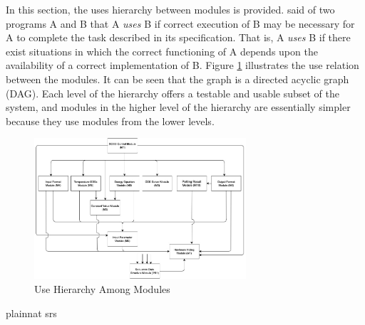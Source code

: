 \documentclass[12pt, titlepage]{article}
\begin{document}
In this section, the uses hierarchy between modules is
provided. \citet{Parnas1978} said of two programs A and B that A {\em uses} B if
correct execution of B may be necessary for A to complete the task described in
its specification. That is, A {\em uses} B if there exist situations in which
the correct functioning of A depends upon the availability of a correct
implementation of B.  Figure \ref{FigUH} illustrates the use relation between
the modules. It can be seen that the graph is a directed acyclic graph
(DAG). Each level of the hierarchy offers a testable and usable subset of the
system, and modules in the higher level of the hierarchy are essentially simpler
because they use modules from the lower levels.

\begin{figure}[H]
\centering
\includegraphics[width=0.7\textwidth]{HierchyModule.jpg}
\caption{Use Hierarchy Among Modules}
\label{FigUH}
\end{figure}

\newpage
 {plainnat}
 {srs}

\newpage{}
\end{document}
